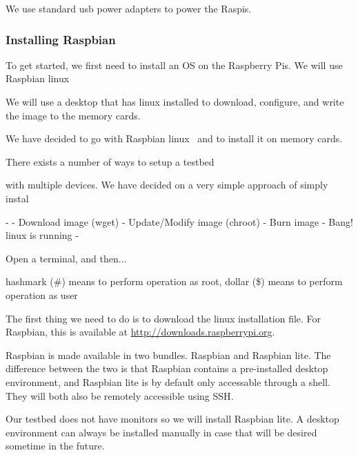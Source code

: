 We use standard usb power adapters to power the \ac{Raspi}s.

\subsubsection{Installing Raspbian}

To get started, we first need to install an \ac{OS} on the
Raspberry Pis. We will use Raspbian linux~\cite{raspbian}

We will use a desktop that has linux installed to download,
configure, and write the image to the memory cards.


We have decided to go with Raspbian linux~\cite{raspbian} and
to install it on memory cards.



There exists a number of ways to setup a testbed

with multiple devices. We
have decided on a very simple approach of simply instal


-
- Download image (wget)
- Update/Modify image (chroot)
- Burn image
- Bang! linux is running
-

Open a terminal, and then...

hashmark (\#) means to perform operation as root, dollar (\$) means to perform operation as user


The first thing we need to do is to download the linux installation file.
For Raspbian, this is available at \url{http://downloads.raspberrypi.org}.

Raspbian is made available in two bundles. Raspbian and Raspbian lite.
The difference between the two is that Raspbian contains a pre-installed desktop
environment, and Raspbian lite is by default only accessable through a shell. 
They will both also be remotely accessible using \ac{SSH}.

Our testbed does not have monitors so we will install Raspbian lite.
A desktop environment can always be installed manually in case that will be
desired sometime in the future.

